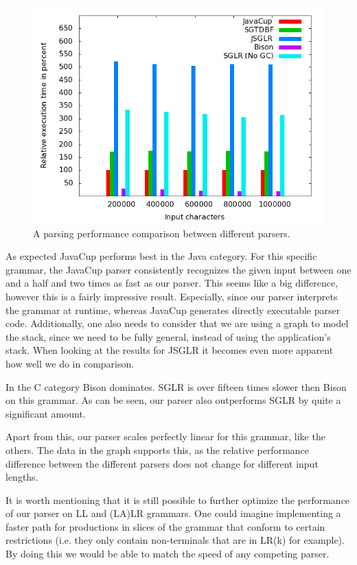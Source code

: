 \documentclass[a4paper,10pt]{article}
\begin{document}
\begin{figure}[H]
\centering
\includegraphics[scale=0.4]{vsLALR.png}
\caption{A parsing performance comparison between different parsers.}
\end{figure}

As expected JavaCup performs best in the Java category. For this specific grammar, the JavaCup parser consistently recognizes the given input between one and a half and two times as fast as our parser. This seems like a big difference, however this is a fairly impressive result. Especially, since our parser interprets the grammar at runtime, whereas JavaCup generates directly executable parser code. Additionally, one also needs to consider that we are using a graph to model the stack, since we need to be fully general, instead of using the application's stack. When looking at the results for JSGLR it becomes even more apparent how well we do in comparison.

In the C category Bison dominates. SGLR is over fifteen times slower then Bison on this grammar. As can be seen, our parser also outperforms SGLR by quite a significant amount.

Apart from this, our parser scales perfectly linear for this grammar, like the others. The data in the graph supports this, as the relative performance difference between the different parsers does not change for different input lengths.

It is worth mentioning that it is still possible to further optimize the performance of our parser on LL and (LA)LR grammars. One could imagine implementing a faster path for productions in slices of the grammar that conform to certain restrictions (i.e. they only contain non-terminals that are in LR(k) for example). By doing this we would be able to match the speed of any competing parser.
\end{document}
